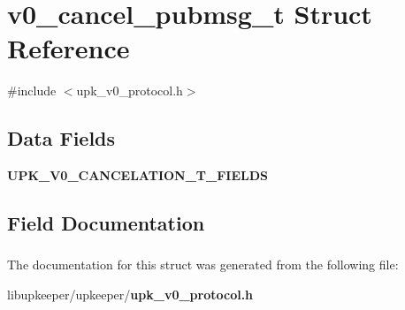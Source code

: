 \section{v0\_\-cancel\_\-pubmsg\_\-t Struct Reference}
\label{structv0__cancel__pubmsg__t}


{\ttfamily \#include $<$upk\_\-v0\_\-protocol.h$>$}

\subsection*{Data Fields}
\begin{DoxyCompactItemize}
\item 
{\bf UPK\_\-V0\_\-CANCELATION\_\-T\_\-FIELDS}
\end{DoxyCompactItemize}


\subsection{Field Documentation}
\subsubsection[{UPK\_\-V0\_\-CANCELATION\_\-T\_\-FIELDS}]{}\label{structv0__cancel__pubmsg__t_ac151f4f89c632f3e4abe68bd7e3ff564}


The documentation for this struct was generated from the following file:\begin{DoxyCompactItemize}
\item 
libupkeeper/upkeeper/{\bf upk\_\-v0\_\-protocol.h}\end{DoxyCompactItemize}
